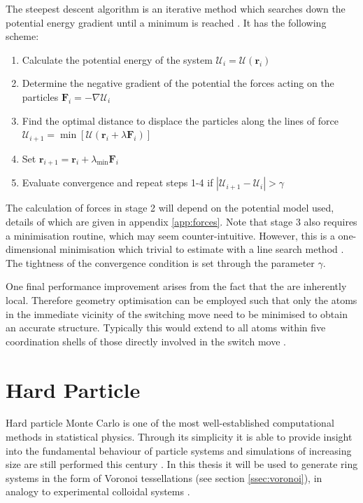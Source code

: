 The steepest descent algorithm is an iterative method which searches down the potential energy gradient until a minimum is reached \cite{Nocedal2006}.
It has the following scheme:
\begin{enumerate}
	\item Calculate the potential energy of the system $\mathcal{U}_i=\mathcal{U}\left(\mathbf{r}_i\right)$
	\item Determine the negative gradient of the potential \ie{} the forces acting on the particles $\mathbf{F}_i=-\nabla \mathcal{U}_i$ 
	\item Find the optimal distance to displace the particles along the lines of force $\mathcal{U}_{i+1}=\min \left[\mathcal{U}\left(\mathbf{r}_i+\lambda \mathbf{F}_i\right)\right]$
	\item Set $\mathbf{r}_{i+1}=\mathbf{r}_i+\lambda_{\text{min}} \mathbf{F}_i$
	\item Evaluate convergence and repeat steps 1-4 if $\left|\mathcal{U}_{i+1}-\mathcal{U}_i\right|>\gamma$
\end{enumerate}
The calculation of forces in stage 2 will depend on the potential model used, details of which are given in appendix \ref{app:forces}.
Note that stage 3 also requires a minimisation routine, which may seem counter\--intuitive. 
However, this is a one\--dimensional minimisation which trivial to estimate with a line search method .
The tightness of the convergence condition is set through the parameter $\gamma$.

One final performance improvement arises from the fact that the \mc{} are inherently local.
Therefore geometry optimisation can be employed such that only the atoms in the immediate vicinity of the switching move need to be minimised to obtain an accurate structure.
Typically this would extend to all atoms within five coordination shells of those directly involved in the switch move \cite{Mousseau2001}.

\section{Hard Particle \mc}
\label{s:hardparticlemc}

Hard particle Monte Carlo is one of the most well\--established computational methods in statistical physics.
Through its simplicity it is able to provide insight into the fundamental behaviour of particle systems and simulations of increasing size are still performed this century \cite{Isobe2016,Bernard2009,Anderson2013,Isobe2015}.
In this thesis it will be used to generate ring systems in the form of Voronoi tessellations (see section \ref{ssec:voronoi}), in analogy to experimental colloidal systems \cite{Thorneywork2017}.

